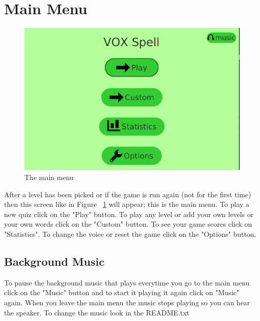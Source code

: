 \documentclass[12pt,a4paper,titlepage,onecolumn]{article}
\begin{document}
	\section{Main Menu}\label{mainmenu}
	\begin{figure}[h]
	\centering
	\includegraphics[width=1\linewidth]{"Figures/Main Menu/MainMenuGeneral"}
	\caption[Main Menu]{The main menu}
	\label{fig:MainMenuGeneral}
	\end{figure}
	After a level has been picked or if the game is run again (not for the first time) then this screen like in Figure ~\ref{fig:MainMenuGeneral} will appear; this is the main menu. To play a new quiz click on the "Play" button. To play any level or add your own levels or your own words click on the "Custom" button. To see your game scores click on "Statistics". To change the voice or reset the game click on the "Options" button. 
	\subsection{Background Music}
	To pause the background music that plays everytime you go to the main menu click on the "Music" button and to start it playing it again click on "Music" again. When you leave the main menu the music stops playing so you can hear the speaker. To change the music look in the README.txt
	
\end{document}
